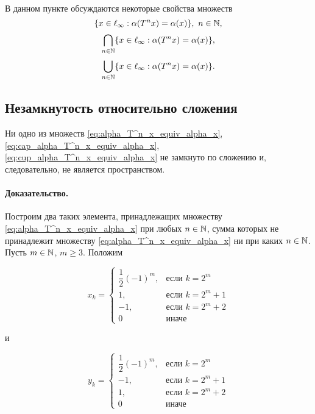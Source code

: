 В данном пункте обсуждаются некоторые свойства множеств
\begin{equation}
	\label{eq:alpha_T^n_x_equiv_alpha_x}
	\{x \in \ell_\infty : \alpha(T^n x) = \alpha(x) \}, ~n\in\N,
\end{equation}
\begin{equation}
	\label{eq:cap_alpha_T^n_x_equiv_alpha_x}
	\bigcap\limits_{n\in\N}\{x \in \ell_\infty : \alpha(T^n x) = \alpha(x) \}
	,
\end{equation}
\begin{equation}
	\label{eq:cup_alpha_T^n_x_equiv_alpha_x}
	\bigcup_{n\in\N}\{x \in \ell_\infty : \alpha(T^n x) = \alpha(x) \}
	.
\end{equation}

\subsection{Незамкнутость относительно сложения}

\begin{theorem}
	Ни одно из множеств
	\eqref{eq:alpha_T^n_x_equiv_alpha_x}, \eqref{eq:cap_alpha_T^n_x_equiv_alpha_x}, \eqref{eq:cup_alpha_T^n_x_equiv_alpha_x}
	не замкнуто по сложению и, следовательно, не является пространством.
\end{theorem}

\paragraph{Доказательство.}
Построим два таких элемента, принадлежащих множеству \eqref{eq:alpha_T^n_x_equiv_alpha_x} при любых $n\in\mathbb{N}$,
сумма которых не принадлежит множеству \eqref{eq:alpha_T^n_x_equiv_alpha_x} ни при каких $n\in\mathbb{N}$.
Пусть $m\in\mathbb{N}$, $m \geq 3$.
Положим

\begin{equation}
	x_k = \begin{cases}
		\dfrac{1}{2}(-1)^m,  & \mbox{если } k = 2^m     \\
		1,                   & \mbox{если } k = 2^m + 1 \\
		-1,                  & \mbox{если } k = 2^m + 2 \\
		0                    & \mbox{иначе }
	\end{cases}
\end{equation}

и

\begin{equation}
	y_k = \begin{cases}
		\dfrac{1}{2}(-1)^m,  & \mbox{если } k = 2^m     \\
		-1,                  & \mbox{если } k = 2^m + 1 \\
		1,                   & \mbox{если } k = 2^m + 2 \\
		0                    & \mbox{иначе }
	\end{cases}
\end{equation}

